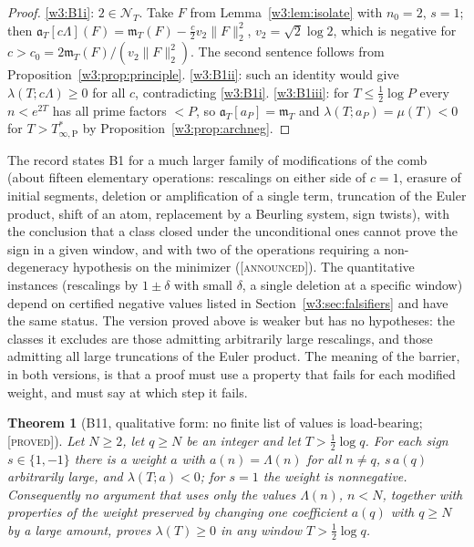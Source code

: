 \documentclass[11pt]{amsart}
\newtheorem{theorem}{Theorem}[section]
\theoremstyle{definition}
\theoremstyle{remark}
\numberwithin{equation}{section}
\newcommand{\NT}{\mathcal{N}_T}                        %
\newcommand{\mT}{\mathfrak{m}_T}                       %
\newcommand{\aT}{\mathfrak{a}_T}                       %
\newcommand{\lam}{\lambda(T)}                          %
\newcommand{\Tarch}{T^{*}_{\infty,\mathrm P}}          %
\newcommand{\stag}[1]{\textsc{[#1]}}
\newcommand{\PROVED}{\stag{proved}}
\newcommand{\ANNOUNCED}{\stag{announced}}
\begin{document}
\begin{proof}
\ref{w3:B1i}: $2\in\NT$. Take $F$ from Lemma~\ref{w3:lem:isolate} with $n_0=2$, $s=1$; then
$\aT[c\Lambda](F)=\mT(F)-\frac c2v_2\|F\|_2^2$, $v_2=\sqrt2\log2$, which is negative for
$c>c_0=2\mT(F)/(v_2\|F\|_2^2)$. The second sentence follows from Proposition~\ref{w3:prop:principle}.
\ref{w3:B1ii}: such an identity would give $\lambda(T;c\Lambda)\ge0$ for all $c$, contradicting \ref{w3:B1i}.
\ref{w3:B1iii}: for $T\le\frac12\log P$ every $n<e^{2T}$ has all prime factors $<P$, so $\aT[a_P]=\mT$ and
$\lambda(T;a_P)=\mu(T)<0$ for $T>\Tarch$ by Proposition~\ref{w3:prop:archneg}.
\end{proof}

The record states B1 for a much larger family of modifications of the comb (about fifteen elementary
operations: rescalings on either side of $c=1$, erasure of initial segments, deletion or amplification of a
single term, truncation of the Euler product, shift of an atom, replacement by a Beurling system, sign
twists), with the conclusion that a class closed under the unconditional ones cannot prove the sign in a
given window, and with two of the operations requiring a non-degeneracy hypothesis on the minimizer
(\ANNOUNCED). The quantitative instances (rescalings by $1\pm\delta$ with small $\delta$, a single deletion at a
specific window) depend on certified negative values listed in Section~\ref{w3:sec:falsifiers} and have the
same status. The version proved above is weaker but has no hypotheses: the classes it excludes are those
admitting arbitrarily large rescalings, and those admitting all large truncations of the Euler product. The
meaning of the barrier, in both versions, is that a proof must use a property that fails for each modified
weight, and must say at which step it fails.

\begin{theorem}[B11, qualitative form: no finite list of values is load-bearing; \PROVED]\label{w3:bar:B11}
Let $N\ge2$, let $q\ge N$ be an integer and let $T>\frac12\log q$. For each sign $s\in\{1,-1\}$ there is a weight
$a$ with $a(n)=\Lambda(n)$ for all $n\ne q$, $s\,a(q)$ arbitrarily large, and $\lambda(T;a)<0$; for $s=1$ the
weight is nonnegative. Consequently no argument that uses only the values $\Lambda(n)$, $n<N$, together with
properties of the weight preserved by changing one coefficient $a(q)$ with $q\ge N$ by a large amount, proves
$\lam\ge0$ in any window $T>\frac12\log q$.
\end{theorem}
\end{document}
